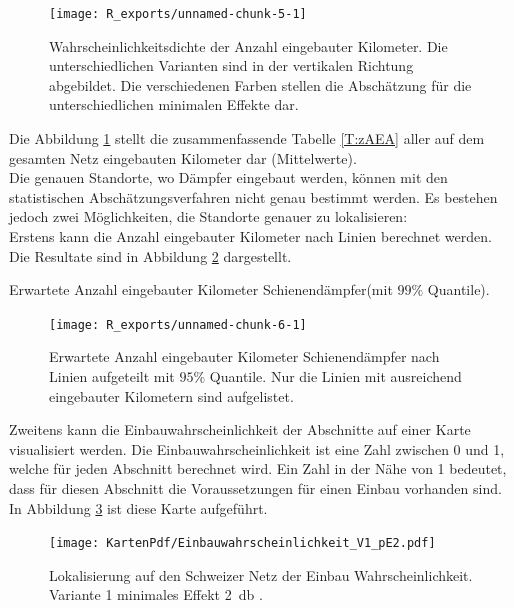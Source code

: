 \begin{figure}[!htb]
	\centering
\begin{knitrout}
\color{fgcolor}
\texttt{[image: R\_exports/unnamed-chunk-5-1]} 

\end{knitrout}
	\caption{Wahrscheinlichkeitsdichte der Anzahl eingebauter Kilometer. Die unterschiedlichen Varianten sind in der vertikalen Richtung abgebildet. Die verschiedenen Farben stellen die Abschätzung für die unterschiedlichen minimalen Effekte dar.}
	\label{F:pAEA}
\end{figure}
Die Abbildung \ref{F:pAEA} stellt die zusammenfassende Tabelle \ref{T:zAEA} aller auf dem gesamten Netz eingebauten Kilometer dar (Mittelwerte).\\

Die genauen Standorte, wo Dämpfer eingebaut werden, können mit den statistischen Abschätzungsverfahren nicht genau bestimmt werden. Es bestehen jedoch zwei Möglichkeiten, die Standorte genauer zu lokalisieren: \\
Erstens kann die Anzahl eingebauter Kilometer nach Linien berechnet werden. Die Resultate sind in Abbildung \ref{F:pAEAL} dargestellt.\\ 
\begin{table}[!htb]
	\begin{center}
	
	\caption{Erwartete Anzahl eingebauter Kilometer Schienendämpfer(mit $99\%$ Quantile).}
	\label{T:zAEA}
\end{center}
\end{table}

\begin{figure}[!htb]
	\centering
\begin{knitrout}
\color{fgcolor}
\texttt{[image: R\_exports/unnamed-chunk-6-1]} 

\end{knitrout}
	\caption{Erwartete Anzahl eingebauter Kilometer Schienendämpfer nach Linien aufgeteilt mit $95\%$ Quantile. Nur die Linien mit ausreichend eingebauter Kilometern sind aufgelistet.}
	\label{F:pAEAL}
\end{figure}

Zweitens kann die Einbauwahrscheinlichkeit der Abschnitte auf einer Karte visualisiert werden. Die Einbauwahrscheinlichkeit ist eine Zahl zwischen 0 und 1, welche für jeden Abschnitt berechnet wird. Ein Zahl in der Nähe von 1 bedeutet, dass für diesen Abschnitt die Voraussetzungen für einen Einbau vorhanden sind. In Abbildung \ref{F:kartepE} ist diese Karte aufgeführt.
\begin{figure}
	\texttt{[image: KartenPdf/Einbauwahrscheinlichkeit\_V1\_pE2.pdf]}
	\setcapwidth[c]{\textwidth}
	\caption{Lokalisierung auf den Schweizer Netz der Einbau Wahrscheinlichkeit. Variante 1 minimales Effekt \SI{2}{\decibel} .}
	\label{F:kartepE}
\end{figure}

